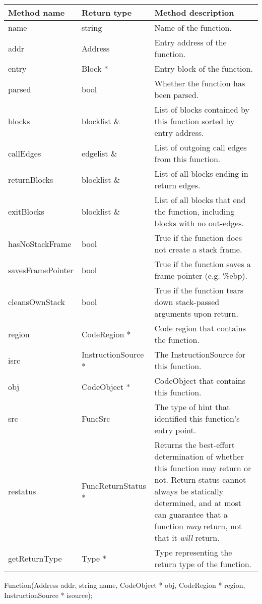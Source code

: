 \begin{tabular}{p{1.25in}p{1.125in}p{3.125in}}
	Method name & Return type & Method description \\
	\hline
	name & string & Name of the function. \\
	addr & Address & Entry address of the function.  \\
	entry & Block * & Entry block of the function. \\
	parsed & bool & Whether the function has been parsed. \\
	blocks & blocklist \& & List of blocks contained by this function sorted by entry address. \\
	callEdges & edgelist \& & List of outgoing call edges from this function. \\
	returnBlocks & blocklist \& & List of all blocks ending in return edges. \\
	exitBlocks & blocklist \& & List of all blocks that end the function, including blocks with no out-edges. \\
	hasNoStackFrame & bool & True if the function does not create a stack frame. \\
	savesFramePointer & bool & True if the function saves a frame pointer (e.g. \%ebp). \\
	cleansOwnStack & bool & True if the function tears down stack-passed arguments upon return. \\
	region & CodeRegion * & Code region that contains the function. \\
	isrc & InstructionSource * & The InstructionSource for this function. \\
	obj & CodeObject * & CodeObject that contains this function. \\
	src & FuncSrc & The type of hint that identified this function's entry point. \\
	restatus & FuncReturnStatus * & Returns the best-effort determination of whether this function may return or not. Return status cannot always be statically determined, and at most can guarantee that a function \emph{may} return, not that it \emph{will} return. \\
	getReturnType & Type * & Type representing the return type of the function. \\
\end{tabular}

\begin{apient}
Function(Address addr, string name, CodeObject * obj, CodeRegion * region, InstructionSource * isource);
\end{apient}


